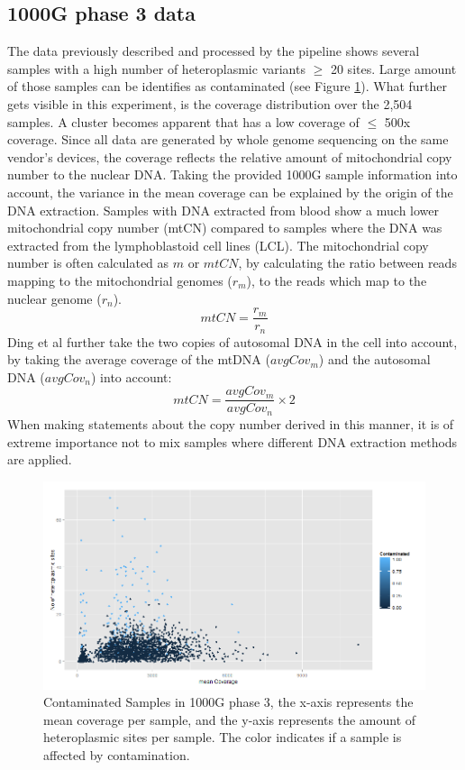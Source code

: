 \subsection{1000G phase 3 data}
The data previously described and processed by the pipeline shows several samples with a high number of heteroplasmic variants $\geq$ 20 sites. Large amount of those samples can be identifies as contaminated (see Figure \ref{cont:1000G}). What further gets visible in this experiment, is the coverage distribution over the 2,504 samples. A cluster becomes apparent that has a low coverage of $\leq$ 500x coverage. Since all data are generated by whole genome sequencing on the same vendor's devices, the coverage reflects the relative amount of mitochondrial copy number to the nuclear DNA. Taking the provided 1000G sample information into account, the variance in the mean coverage can be explained by the origin of the DNA extraction. Samples with DNA extracted from blood show a much lower mitochondrial copy number (mtCN) compared to samples where the DNA was extracted from the lymphoblastoid cell lines (LCL). The mitochondrial copy number is often calculated as $m$ or $mtCN$, by calculating the ratio between reads mapping to the mitochondrial genomes ($r_m$), to the reads which map to the nuclear genome ($r_n$)\cite{Reznik2016}.
\begin{equation}
mtCN = \frac{r_m}{r_n}
\end{equation}
Ding et al \cite{Ding2015} further take the two copies of autosomal DNA in the cell into account, by taking the average coverage of the mtDNA ($avgCov_m$) and the autosomal DNA ($avgCov_n$) into account:
\begin{equation}
mtCN = \frac{avgCov_m}{avgCov_n}\times{2}
\end{equation}
When making statements about the copy number derived in this manner, it is of extreme importance not to mix samples where different DNA extraction methods are applied.
\begin{figure}[!ht]
    \centering
    \includegraphics[width=1\textwidth]{images/contamination1000g.png}
    \caption[Contaminated Samples in 1000G phase 3]{Contaminated Samples in 1000G phase 3, the x-axis represents the mean coverage per sample, and the y-axis represents the amount of heteroplasmic sites per sample. The color indicates if a sample is affected by contamination.} 
    \label{cont:1000G}
\end{figure}

